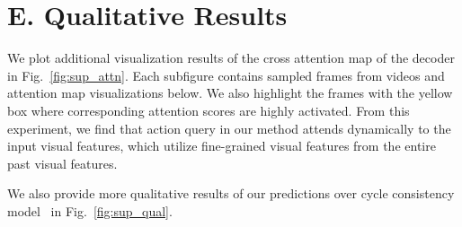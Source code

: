 
\section*{E. Qualitative Results}
\label{sec:E}
We plot additional visualization results of the cross attention map of the decoder in Fig.~\ref{fig:sup_attn}.
Each subfigure contains sampled frames from videos and attention map visualizations below.
We also highlight the frames with the yellow box where corresponding attention scores are highly activated.
From this experiment, we find that action query in our method attends dynamically to the input visual features, which utilize fine-grained visual features from the entire past visual features.

We also provide more qualitative results of our predictions over cycle consistency model~\cite{farha2020long} in Fig.~\ref{fig:sup_qual}. 


